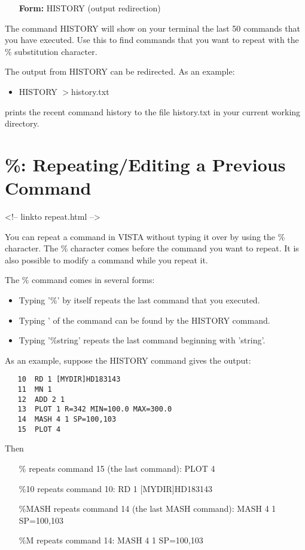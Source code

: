 \begin{itemize}
  \item[\textbf{Form: }HISTORY (output redirection)]{}
\end{itemize}

The command HISTORY will show on your terminal the last 50 commands that
you have executed.  Use this to find commands that you want to repeat with
the \% substitution character.

The output from HISTORY can be redirected.  As an example:
\begin{itemize}
  \item{HISTORY $>$history.txt}
\end{itemize}
prints the recent command history to the file history.txt in your
current working directory.

\section{\%: Repeating/Editing a Previous Command}
\begin{rawhtml}
<!-- linkto repeat.html -->
\end{rawhtml}

You can repeat a command in VISTA without typing it over by using the \%
character.  The \% character comes before the command you want to repeat.
It is also possible to modify a command while you repeat it.

The \% command comes in several forms:
\begin{itemize}
  \item{Typing '\%' by itself repeats the last command that you executed. }

  \item{Typing '%
   of the command can be found by the HISTORY command.}

  \item{Typing '\%string' repeats the last command beginning with 'string'.}
\end{itemize}

As an example, suppose the HISTORY command gives the output:
\begin{verbatim}
   10  RD 1 [MYDIR]HD183143
   11  MN 1
   12  ADD 2 1
   13  PLOT 1 R=342 MIN=100.0 MAX=300.0
   14  MASH 4 1 SP=100,103
   15  PLOT 4
\end{verbatim}
Then
\begin{itemize}
   \item[\%\hfill]{repeats command 15 (the last command):  PLOT 4}
   \item[\%10\hfill]{repeats command 10:  RD 1 [MYDIR]HD183143}
   \item[\%MASH \hfill]{repeats command 14 (the last MASH command): 
       MASH 4 1 SP=100,103}
   \item[\%M\hfill]{repeats command 14:  MASH 4 1 SP=100,103}
\end{itemize}

